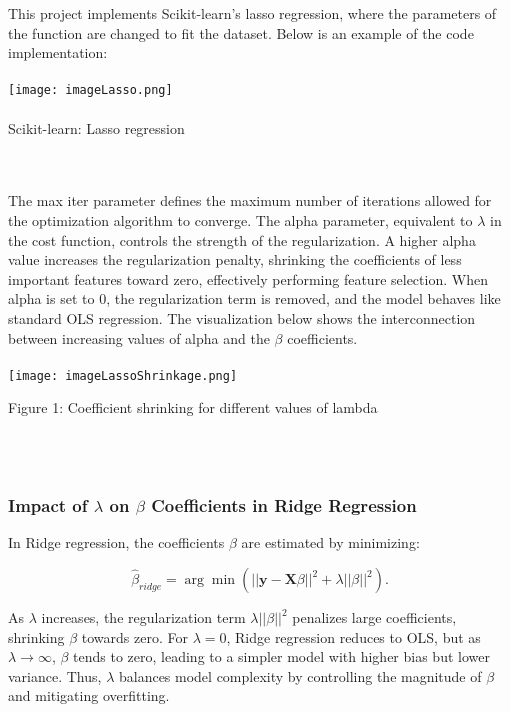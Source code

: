 \documentclass{article}
\begin{document}
This project implements \cite{scikit-learn} Scikit-learn's lasso regression, where the parameters of the function are changed to fit the dataset. Below is an example of the code implementation:\\\\

    \texttt{[image: imageLasso.png]}\\\\
    \caption{\cite{scikit-learn} Scikit-learn: Lasso regression}
    \label{fig:enter-label}\\\\

The max iter parameter defines the maximum number of iterations allowed for the optimization algorithm to converge. The alpha parameter, equivalent to \(\lambda\) in the cost function, controls the strength of the regularization. A higher alpha value increases the regularization penalty, shrinking the coefficients of less important features toward zero, effectively performing feature selection. When alpha is set to 0, the regularization term is removed, and the model behaves like standard OLS regression. The visualization below shows the interconnection between increasing values of alpha and the \(\beta\) coefficients.  \\\\

    
    \texttt{[image: imageLassoShrinkage.png]}
    \caption{Figure 1: Coefficient shrinking for different values of lambda}
    \label{fig:enter-label}\\\\
    


\subsubsection{Impact of \(\lambda\) on \(\beta\) Coefficients in Ridge Regression}

In Ridge regression, the coefficients \(\beta\) are estimated by minimizing:

\[
\hat{\beta}_{ridge} = \arg\min \left( ||\mathbf{y} - \mathbf{X}\beta||^2 + \lambda ||\beta||^2 \right).
\]

As \(\lambda\) increases, the regularization term \(\lambda ||\beta||^2\) penalizes large coefficients, shrinking \(\beta\) towards zero. For \(\lambda = 0\), Ridge regression reduces to OLS, but as \(\lambda \to \infty\), \(\beta\) tends to zero, leading to a simpler model with higher bias but lower variance. Thus, \(\lambda\) balances model complexity by controlling the magnitude of \(\beta\) and mitigating overfitting. \\\\
\end{document}
